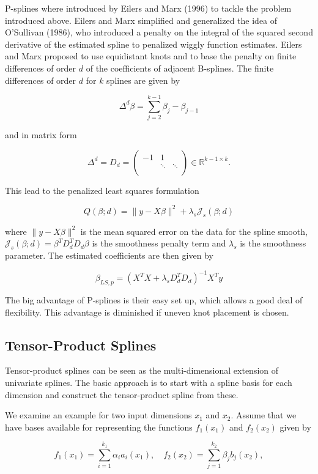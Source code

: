 \documentclass[10pt,a4paper]{article}
\begin{document}
P-splines where introduced by Eilers and Marx (1996) to tackle the problem introduced above. Eilers and Marx simplified and generalized the idea of O'Sullivan (1986), who introduced a penalty on the integral of the squared second derivative of the estimated spline to penalized wiggly function estimates. Eilers and Marx proposed to use equidistant knots and to base the penalty on finite differences of order $d$ of the coefficients of adjacent B-splines. The finite differences of order $d$ for $k$ splines are given by

$$\Delta^d \beta = \sum_{j=2}^{k-1} \beta_{j} - \beta_{j-1}$$

and in matrix form

$$\Delta^d = D_d = \begin{pmatrix} -1 & 1 \\ & \ddots & \ddots \\   \end{pmatrix} \in \mathbb{R}^{k-1 \times k}.$$

This lead to the penalized least squares formulation

$$Q(\beta; d) = \lVert y - X\beta\rVert^2 + \lambda_s \mathcal J_s(\beta;d)$$

where $\lVert y - X\beta \rVert^2$ is the mean squared error on the data for the spline smooth, $\mathcal J_s(\beta;d) = \beta^T D_d^T D_d \beta$ is the smoothness penalty term and $\lambda_s$ is the smoothness parameter. The estimated coefficients are then given by

$$\beta_{LS,p} = (X^TX + \lambda_s D_d^T D_d)^{-1}X^Ty$$

The big advantage of P-splines is their easy set up, which allows a good deal of flexibility. This advantage is diminished if uneven knot placement is chosen. 

\subsection{Tensor-Product Splines}

Tensor-product splines can be seen as the multi-dimensional extension of univariate splines. The basic approach is to start with a spline basis for each dimension and construct the tensor-product spline from these. 

We examine an example for two input dimensions $x_1$ and $x_2$. Assume that we have bases available for representing the functions $f_1(x_1)$ and $f_2(x_2)$ given by

$$f_1(x_1) = \sum_{i=1}^{k_1} \alpha_i a_i(x_1), \quad f_2(x_2) = \sum_{j=1}^{k_2} \beta_j b_j(x_2),$$
\end{document}
